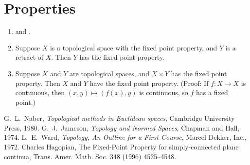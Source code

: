 \documentclass[12pt]{article}
\begin{document}
\section*{Properties}
\begin{enumerate}
\item {}
and .
\item Suppose $X$ is a topological space with the
fixed point property, and $Y$ is a retract of $X$. Then
$Y$ has the fixed point property.
\item Suppose $X$ and $Y$ are topological spaces, and $X\times Y$ has the
fixed point property. Then $X$ and $Y$ have the fixed point property.
(Proof: If $f\colon X\to X$ is continuous,
then $(x,y)\mapsto (f(x),y)$ is continuous, so $f$ has a fixed point.)
\end{enumerate}

\begin{thebibliography}{9}
  G.\ L.\ Naber, \emph{Topological methods in Euclidean spaces},
   Cambridge University Press, 1980.
  G.\ J.\ Jameson, \emph{Topology and Normed Spaces},
   Chapman and Hall, 1974.
  L.\ E.\ Ward, \emph{Topology, An Outline for a First Course},
   Marcel Dekker, Inc., 1972.
  Charles Hagopian,
   The Fixed-Point Property for simply-connected plane continua,
   Trans. Amer. Math. Soc. 348 (1996) 4525--4548.
 \end{thebibliography}
\end{document}
